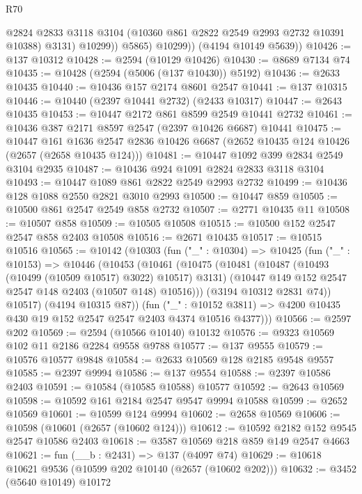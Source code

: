 \begin{lexlean}{R70}
\begin{coremodule}
                  @2824
                  @2833
                  @3118
                  @3104
                  (@10360 @861 @2822 @2549 @2993 @2732 @10391 @10388)
                  @3131)
                @10299))
            @5865)
          @10299))
      (@4194 @10149 @5639))
@10426 := @137 @10312
@10428 := @2594 (@10129 @10426)
@10430 := @8689 @7134 @74
@10435 := @10428 (@2594 (@5006 (@137 @10430)) @5192)
@10436 := @2633 @10435
@10440 := @10436 @157 @2174 @8601 @2547
@10441 := @137 @10315
@10446 := @10440 (@2397 @10441 @2732) (@2433 @10317)
@10447 := @2643 @10435
@10453 := @10447 @2172 @861 @8599 @2549 @10441 @2732
@10461 := @10436 @387 @2171 @8597 @2547 (@2397 @10426 @6687) @10441
@10475 := @10447
    @161
    @1636
    @2547
    @2836
    @10426
    @6687
    (@2652 @10435 @124 @10426 (@2657 (@2658 @10435 @124)))
@10481 := @10447 @1092 @399 @2834 @2549 @3104 @2935
@10487 := @10436 @924 @1091 @2824 @2833 @3118 @3104
@10493 := @10447 @1089 @861 @2822 @2549 @2993 @2732
@10499 := @10436 @128 @1088 @2550 @2821 @3010 @2993
@10500 := @10447 @859
@10505 := @10500 @861 @2547 @2549 @858 @2732
@10507 := @2771 @10435 @11
@10508 := @10507 @858
@10509 := @10505 @10508
@10515 := @10500 @152 @2547 @2547 @858 @2403 @10508
@10516 := @2671 @10435
@10517 := @10515 @10516
@10565 := @10142
    (@10303
      (fun ("_" : @10304) =>
      @10425
        (fun ("_" : @10153) =>
        @10446
          (@10453
            (@10461
              (@10475
                (@10481
                  (@10487 (@10493 (@10499 (@10509 @10517) @3022) @10517) @3131)
                  (@10447 @149 @152 @2547 @2547 @148 @2403 (@10507 @148) @10516)))
              (@3194 @10312 @2831 @74))
            @10517)
          (@4194 @10315 @87))
        (fun ("_" : @10152 @3811) =>
        @4200 @10435 @430 @19 @152 @2547 @2547 @2403 @4374 @10516 @4377)))
@10566 := @2597 @202
@10569 := @2594 (@10566 @10140) @10132
@10576 := @9323 @10569 @102 @11 @2186 @2284 @9558 @9788
@10577 := @137 @9555
@10579 := @10576 @10577 @9848
@10584 := @2633 @10569 @128 @2185 @9548 @9557
@10585 := @2397 @9994
@10586 := @137 @9554
@10588 := @2397 @10586 @2403
@10591 := @10584 (@10585 @10588) @10577
@10592 := @2643 @10569
@10598 := @10592 @161 @2184 @2547 @9547 @9994 @10588
@10599 := @2652 @10569
@10601 := @10599 @124 @9994
@10602 := @2658 @10569
@10606 := @10598 (@10601 (@2657 (@10602 @124)))
@10612 := @10592 @2182 @152 @9545 @2547 @10586 @2403
@10618 := @3587 @10569 @218 @859 @149 @2547 @4663
@10621 := fun (__b : @2431) => @137 (@4097 @74)
@10629 := @10618 @10621 @9536 (@10599 @202 @10140 (@2657 (@10602 @202)))
@10632 := @3452 (@5640 @10149) @10172

\end{coremodule}
\end{lexlean}
